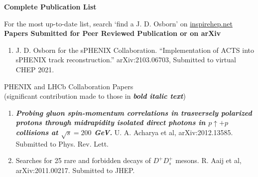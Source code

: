 \documentclass[11pt]{article}
\begin{document}
%
%
%

\newpage




\cleardoublepage

\begin{flushleft}

\huge\textbf{Complete Publication List}
\vspace{0.5cm}

{\large For the most up-to-date list, search `find a J. D. Osborn' on \href{inspirehep.net}{inspirehep.net} \\}
\vspace{0.5cm}
\Large\textbf{Papers Submitted for Peer Reviewed Publication or on arXiv} \\
\normalsize
\begin{center}
	\begin{flushleft}
	
	\begin{enumerate}
			\item J. D. Osborn for the sPHENIX Collaboration. ``Implementation of ACTS into sPHENIX track reconstruction.'' arXiv:2103.06703, Submitted to virtual CHEP 2021.
		
	\end{enumerate}
	
	\vspace{1cm}
	\large PHENIX and LHCb Collaboration Papers\\ (significant contribution made to those in \textbf{\textit{bold italic text}}) \\
	\end{flushleft}
	\begin{enumerate}

	\item \textbf{\textit{Probing gluon spin-momentum correlations in trasversely polarized protons through midrapidity isolated direct photons in $p\uparrow+p$ collisions at $\sqrt{s}=200$ GeV.}} U. A. Acharya et al, arXiv:2012.13585. Submitted to Phys. Rev. Lett.
			

		\item Searches for 25 rare and forbidden decays of $D^+D_s^+ $ mesons. R. Aaij et al, arXiv:2011.00217. Submitted to JHEP.


\end{enumerate}
\end{center}
\end{flushleft}
\end{document}
